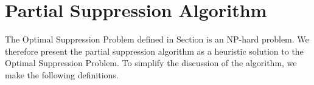  \section{Partial Suppression Algorithm}
\label{sec:algo}


The Optimal Suppression Problem defined in Section  is
an NP-hard problem\cite{meyerson2004complexity}.
We therefore present the partial suppression algorithm as a
heuristic solution to the Optimal Suppression Problem.
To simplify the discussion of the algorithm, we make the following
definitions.
%
